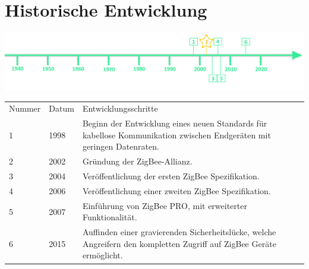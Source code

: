 \section*{Historische Entwicklung}
\includegraphics[width=\textwidth]{Kapitel/ZigBee/Grafiken/Zeitstrahl}
\par
\noindent
{}
\begin{tabular}{p{1 cm}p{3 cm}p{13.55 cm}}
	Nummer & Datum & Entwicklungsschritte~\cite{zigbee.5}\\
	1 & 1998 & Beginn der Entwicklung eines neuen Standards für kabellose Kommunikation zwischen Endgeräten mit geringen Datenraten.\\
	2 & 2002 & Gründung der ZigBee-Allianz.\\
	3 & 2004 & Veröffentlichung der ersten ZigBee Spezifikation.\\
	4 & 2006 & Veröffentlichung einer zweiten ZigBee Spezifikation.\\
	5 & 2007 & Einführung von ZigBee PRO, mit erweiterter Funktionalität.\\
	6 & 2015 & Auffinden einer gravierenden Sicherheitslücke, welche Angreifern den kompletten Zugriff auf ZigBee Geräte ermöglicht.\\
\end{tabular}
\par
